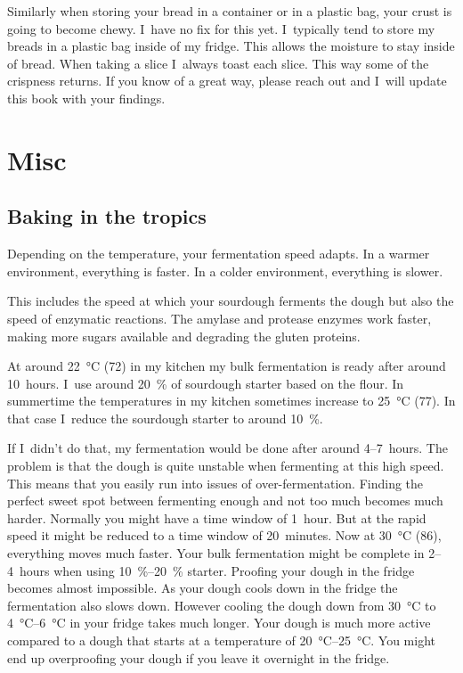 Similarly when storing your bread in a container or in a plastic
bag, your crust is going to become chewy. I~have no fix for this yet.
I~typically tend to store my breads in a plastic bag inside of my fridge.
This allows the moisture to stay inside of bread. When taking a slice
I~always toast each slice. This way some of the crispness returns.
If you know of a great way, please reach out and I~will update
this book with your findings.



\section{Misc}
\subsection{Baking in the tropics}

Depending on the temperature, your fermentation speed adapts.
In a warmer environment, everything is faster. In a colder
environment, everything is slower.

This includes the speed at which your sourdough ferments
the dough but also the speed of enzymatic reactions. The
amylase and protease enzymes work faster, making more
sugars available and degrading the gluten proteins.

At around \qty{22}{\degreeCelsius} (\qty{72}{\degF}) in my kitchen my bulk fermentation is ready
after around 10~hours. I~use around \qty{20}{\percent} of sourdough
starter based on the flour. In summertime the temperatures
in my kitchen sometimes increase to
\qty{25}{\degreeCelsius} (\qty{77}{\degF}). In that case
I~reduce the sourdough starter to around \qty{10}{\percent}.

If I~didn't do that, my fermentation would be done after
around 4--7~hours. The problem is that the dough is quite
unstable when fermenting at this high speed. This means
that you easily run into issues of over-fermentation.
Finding the perfect sweet spot between fermenting enough
and not too much becomes much harder. Normally you might
have a time window of 1~hour. But at the rapid speed it
might be reduced to a time window of 20~minutes. Now at
\qty{30}{\degreeCelsius} (\qty{86}{\degF}), everything moves much faster. Your
bulk fermentation might be complete in 2--4~hours when using
\qtyrange{10}{20}{\percent} starter. Proofing your dough in the fridge becomes
almost impossible. As your dough cools down in the fridge the fermentation
also slows down. However cooling the dough down from \qty{30}{\degreeCelsius}
to \qtyrange{4}{6}{\degreeCelsius} in your fridge takes much longer. Your
dough is much more active compared to a dough that starts at a temperature of
\qtyrange{20}{25}{\degreeCelsius}. You might end up overproofing your dough if
you leave it overnight in the fridge.

